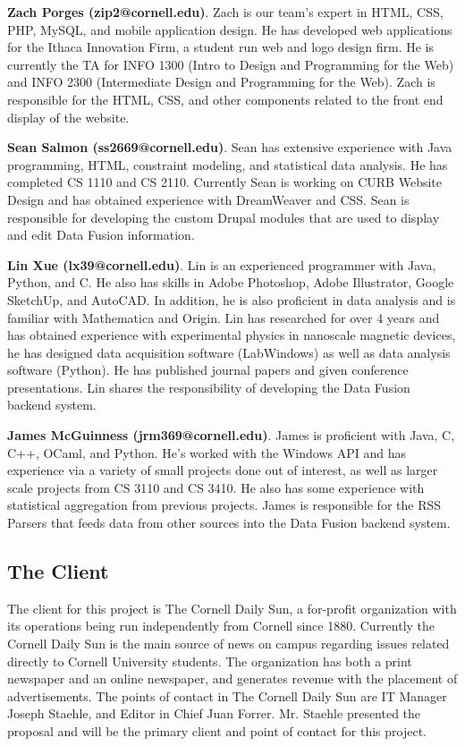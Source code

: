 \documentclass[11pt]{article} %
\begin{document}
\textbf{Zach Porges (zip2@cornell.edu)}. Zach is our team’s expert in HTML, CSS, PHP, MySQL, and mobile application design. He has developed web applications for the Ithaca Innovation Firm, a student run web and logo design firm. He is currently the TA for INFO 1300 (Intro to Design and Programming for the Web) and INFO 2300 (Intermediate Design and Programming for the Web). Zach is responsible for the HTML, CSS, and other components related to the front end display of the website.

\textbf{Sean Salmon (ss2669@cornell.edu)}. Sean has extensive experience with Java programming, HTML, constraint modeling, and statistical data analysis. He has completed CS 1110 and CS 2110. Currently Sean is working on CURB Website Design and has obtained experience with DreamWeaver and CSS. Sean is responsible for developing the custom Drupal modules that are used to display and edit Data Fusion information.

\textbf{Lin Xue (lx39@cornell.edu)}. Lin is an experienced programmer with Java, Python, and C. He also has skills in Adobe Photoshop, Adobe Illustrator, Google SketchUp, and AutoCAD. In addition, he is also proficient in data analysis and is familiar with Mathematica and Origin. Lin has researched for over 4 years and has obtained experience with experimental physics in nanoscale magnetic devices, he has designed data acquisition software (LabWindows) as well as data analysis software (Python). He has published journal papers and given conference presentations. Lin shares the responsibility of developing the Data Fusion backend system.

\textbf{James McGuinness (jrm369@cornell.edu)}. James is proficient with Java, C, C++, OCaml, and Python. He’s worked with the Windows API and has experience via a variety of small projects done out of interest, as well as larger scale projects from CS 3110 and CS 3410. He also has some experience with statistical aggregation from previous projects. James is responsible for the RSS Parsers that feeds data from other sources into the Data Fusion backend system.

\subsection{The Client}

The client for this project is The Cornell Daily Sun, a for-profit organization with its operations being run independently from Cornell since 1880. Currently the Cornell Daily Sun is the main source of news on campus regarding issues related directly to Cornell University students. The organization has both a print newspaper and an online newspaper, and generates revenue with the placement of advertisements. The points of contact in The Cornell Daily Sun are IT Manager Joseph Staehle, and Editor in Chief Juan Forrer.  Mr. Staehle presented the proposal and will be the primary client and point of contact for this project.
\end{document}
